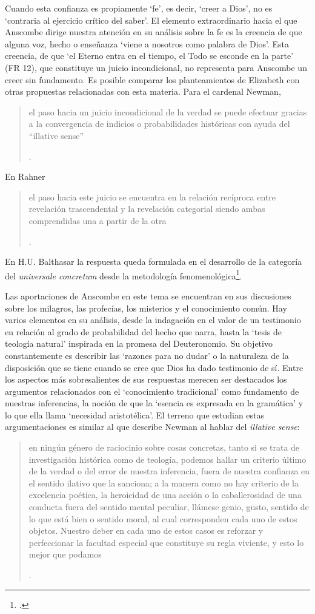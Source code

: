 Cuando esta confianza es propiamente `fe', es decir, `creer a Dios', no es `contraria al ejercicio crítico del saber'. El elemento extraordinario hacia el que Anscombe dirige nuestra atención en su análisis sobre la fe es la creencia de que alguna voz, hecho o enseñanza \enquote*{viene a nosotros como palabra de Dios}. Esta creencia, de que \enquote*{el Eterno entra en el tiempo, el Todo se esconde en la parte} (FR 12), que constituye un juicio incondicional, no representa para Anscombe un creer sin fundamento. Es posible comparar los planteamientos de Elizabeth con otras propuestas relacionadas con esta materia. Para el cardenal Newman, \blockquote[{\Cite[276-277]{ninot2009tf}}.]{el paso hacia un juicio incondicional de la verdad se puede efectuar gracias a la convergencia de indicios o probabilidades históricas con ayuda del ``illative sense''}. En Rahner \blockquote[{\Cite[277]{ninot2009tf}}.]{el paso hacia este juicio se encuentra en la relación recíproca entre revelación trascendental \textelp{} y la revelación categorial \textelp{} siendo ambas comprendidas una a partir de la otra}. En H.U. Balthasar la respuesta queda formulada en el desarrollo de la categoría del \emph{universale concretum} desde la metodología fenomenológica\footcite[277]{ninot2009tf}.

Las aportaciones de Anscombe en este tema se encuentran en sus discusiones sobre los milagros, las profecías, los misterios y el conocimiento común. Hay varios elementos en su análisis, desde la indagación en el valor de un testimonio en relación al grado de probabilidad del hecho que narra, hasta la `tesis de teología natural' inspirada en la promesa del Deuteronomio. Su objetivo constantemente es describir las `razones para no dudar' o la naturaleza de la disposición que se tiene cuando se cree que Dios ha dado testimonio de sí. Entre los aspectos más sobresalientes de sus respuestas merecen ser destacados los argumentos relacionados con el `conocimiento tradicional' como fundamento de nuestras inferencias, la noción de que la `esencia es expresada en la gramática' y lo que ella llama `necesidad aristotélica'. El terreno que estudian estas argumentaciones es similar al que describe Newman al hablar del \emph{illative sense}: \blockquote[{\Cite[293]{newman1870assent}}.]{en ningún género de raciocinio sobre cosas concretas, tanto si se trata de investigación histórica como de teología, podemos hallar un criterio último de la verdad o del error de nuestra inferencia, fuera de nuestra confianza en el sentido ilativo que la sanciona; a la manera como no hay criterio de la excelencia poética, la heroicidad de una acción o la caballerosidad de una conducta fuera del sentido mental peculiar, llámese genio, gusto, sentido de lo que está bien o sentido moral, al cual corresponden cada uno de estos objetos. Nuestro deber en cada uno de estos casos es reforzar y perfeccionar la facultad especial que constituye su regla viviente, y esto lo mejor que podamos}.

